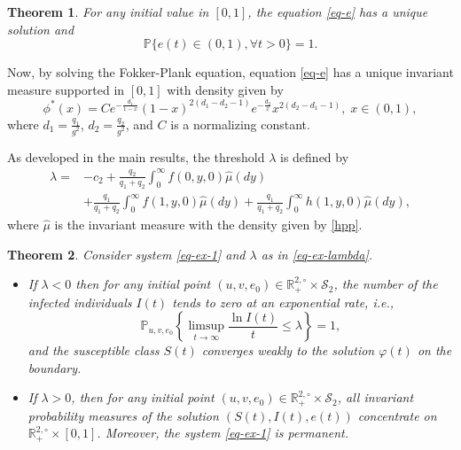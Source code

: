 \documentclass[12pt]{amsart}
\newtheorem{thm}{Theorem}[section]
\theoremstyle{remark}
\numberwithin{equation}{section}
\newcommand{\PP}{\mathbb{P}}
\newcommand{\R}{\mathbb{R}}
\numberwithin{equation}{section}
\newcommand{\1}{\boldsymbol{1}}
\def\hat{\widehat}
\begin{document}
\begin{thm}
	For any initial value in $[0,1]$, the equation \eqref{eq-e} has a unique solution and
	$$\PP\{e(t)\in (0,1), \forall t>0\}=1.$$
\end{thm}
Now, by solving the Fokker-Plank equation, equation \eqref{eq-e} has a unique invariant measure supported in $[0,1]$ with density given by
$$
\phi^*(x)=Ce^{-\frac{d_1}{1-x}}(1-x)^{2(d_1-d_2-1)} e^{-\frac{d_2}{x}}x^{2(d_2-d_1-1)},\;x\in(0,1),
$$
where $d_1=\frac{q_1}{g^2}$,
$d_2=\frac{q_2}{g^2}$, and
$C$ is a normalizing constant.

As developed in the main results, the threshold $\lambda$ is defined by
\begin{equation}\label{eq-ex-lambda}
\begin{aligned}
\lambda
=&-c_2+ \frac{q_2}{q_1+q_2}\int_0^{\infty}f(0,y,0)\hat\mu(dy)\\
&+\frac{q_1}{q_1+q_2}\int_0^{\infty}f(1,y,0)\hat\mu(dy)+\frac{q_1}{q_1+q_2}\int_0^\infty h(1,y,0)\hat\mu(dy),
\end{aligned}
\end{equation}
where
$\hat\mu$ is the invariant measure with the density given by \eqref{hpp}.

\begin{thm} Consider system \eqref{eq-ex-1} and $\lambda$ as in \eqref{eq-ex-lambda}.
	\begin{itemize}
		\item
		If $\lambda<0$ then for any initial point $(u,v,e_0)\in\mathbb{R}_+^{2,\circ}\times\mathcal S_{2}$,
		the number of the infected individuals $I(t)$ tends to zero at an exponential rate, i.e., %
		$$\PP_{u,v,e_0}\left\{\limsup\limits_{t\to\infty}\dfrac{\ln I(t)}{t}\leq \lambda\right\}=1,$$
		and the susceptible class $S(t)$ converges weakly to the solution $\varphi(t)$ on the boundary.
		\item If $\lambda>0$, then for any initial  point $(u,v,e_0)\in \mathbb{R}_+^{2,\circ}\times\mathcal S_{2}$, all invariant probability measures of
		the solution $(S(t),I(t),e(t))$
		 concentrate on $\mathbb{R}_+^{2,\circ}\times[0,1]$.
		Moreover, the system \eqref{eq-ex-1} is permanent.
	\end{itemize}
\end{thm}
\end{document}
